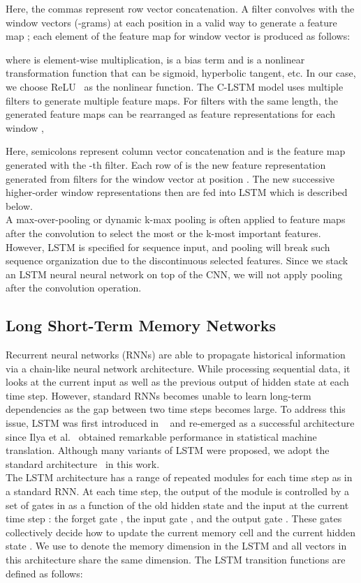 \documentclass[11pt,letterpaper]{article}
\begin{document}
Here, the commas represent row vector concatenation. A filter
 convolves with the window vectors (-grams) at each
position in a valid way to generate a feature map ; each element  of the feature map for window
vector  is produced as follows:

where  is element-wise multiplication,  is a
bias term and  is a nonlinear transformation function that can be
sigmoid, hyperbolic tangent, etc. In our case, we choose
ReLU~\cite{relu} as the nonlinear function. The C-LSTM model uses
multiple filters to generate multiple feature maps. For  filters with
the same length, the generated  feature maps can be rearranged as
feature representations for each window ,

Here, semicolons represent column vector concatenation and
 is the feature map generated with the -th filter. Each
row  of  is
the new feature representation generated from  filters for the window
vector at position . The new successive higher-order window
representations then are fed into LSTM which is described below.\\
\indent A max-over-pooling or dynamic k-max pooling is often applied to
feature maps after the convolution to select the most or the k-most
important features. However, LSTM is specified for sequence input, and
pooling will break such sequence organization due to the discontinuous
selected features. Since we stack an LSTM neural neural network on top of
the CNN, we will not apply pooling after the convolution operation.
\subsection{Long Short-Term Memory Networks}
Recurrent neural networks (RNNs) are able to propagate historical
information via a chain-like neural network architecture. While
processing sequential data, it looks at the current input  as well
as the previous output of hidden state  at each time step.
However, standard RNNs becomes unable to learn long-term dependencies as
the gap between two time steps becomes large.
To address this issue, LSTM was first introduced in ~\cite{lstm} and
re-emerged as a successful architecture since Ilya et
al.~ obtained remarkable performance in statistical
machine translation. Although many variants of LSTM were proposed, we
adopt the standard architecture~\cite{lstm} in this work.\\
\indent The LSTM architecture has a range of repeated modules for each
time step as in a standard RNN. At each time step, the output of the
module is controlled by a set of gates in  as a function
of the old hidden state  and the input at the current time step
: the forget gate , the input gate , and the output gate
. These gates collectively decide how to update the current memory
cell  and the current hidden state . We use  to denote
the memory dimension in the LSTM and all vectors in this architecture
share the same dimension.
The LSTM transition functions are defined as follows:
\end{document}
